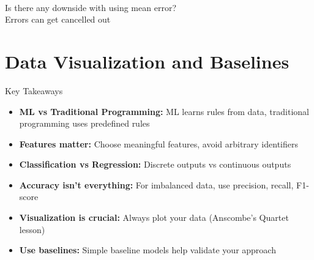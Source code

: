 \documentclass[usenames,dvipsnames]{beamer}
\begin{document}
\begin{frame}$$
%
%

\begin{frame}Is there any downside with using mean error?\\
\pause Errors can get cancelled out

\end{frame}

\section{Data Visualization and Baselines}


\begin{frame}{Key Takeaways}
\begin{itemize}
\item \textbf{ML vs Traditional Programming:} ML learns rules from data, traditional programming uses predefined rules
	\pause
\item \textbf{Features matter:} Choose meaningful features, avoid arbitrary identifiers
	\pause
\item \textbf{Classification vs Regression:} Discrete outputs vs continuous outputs
	\pause
\item \textbf{Accuracy isn't everything:} For imbalanced data, use precision, recall, F1-score
	\pause
\item \textbf{Visualization is crucial:} Always plot your data (Anscombe's Quartet lesson)
	\pause
\item \textbf{Use baselines:} Simple baseline models help validate your approach
\end{itemize}
\end{frame}


\end{frame}
\end{document}
